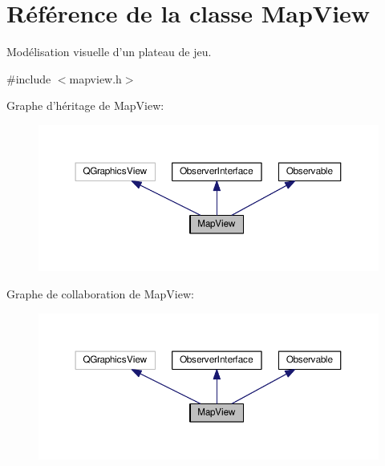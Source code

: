 \hypertarget{classMapView}{\section{Référence de la classe Map\+View}
\label{classMapView}
}


Modélisation visuelle d’un plateau de jeu.  




{\ttfamily \#include $<$mapview.\+h$>$}



Graphe d'héritage de Map\+View\+:
\nopagebreak
\begin{figure}[H]
\begin{center}
\leavevmode
\includegraphics[width=350pt]{d6/d58/classMapView__inherit__graph}
\end{center}
\end{figure}


Graphe de collaboration de Map\+View\+:
\nopagebreak
\begin{figure}[H]
\begin{center}
\leavevmode
\includegraphics[width=350pt]{d1/d7b/classMapView__coll__graph}
\end{center}
\end{figure}

